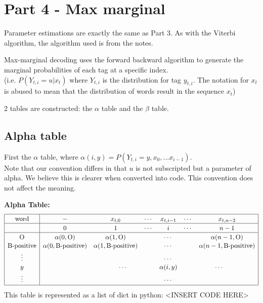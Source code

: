 \documentclass[12pt]{article}
\begin{document}
\section{Part 4 - Max marginal}

Parameter estimations are exactly the same as Part 3. As with the Viterbi algorithm, the algorithm used is from the notes.

\bigskip

Max-marginal decoding uses the forward backward algorithm to generate the marginal probabilities of each tag at a specific index.\\
(i.e. \(P(Y_{t,i}=u | x_t)\) where \(Y_{t,i}\) is the distribution for tag \(y_{t,i}\). The notation for \(x_t\) is abused to mean that the distribution of words result in the sequence \(x_t\))

2 tables are constructed: the \(\alpha\) table and the \(\beta\) table.

\subsection{Alpha table}
First the \(\alpha\) table, where \(\alpha(i, y) = P(Y_{t,i}=y, x_0, ... x_{i-1})\).\\
Note that our convention differs in that \(u\) is not subscripted but a parameter of alpha. We believe this is clearer when converted into code. This convention does not affect the meaning.

\textbf{Alpha Table:}
\[
\begin{array}{|c|cccccc|}
\hline \rule{0pt}{1em}
\mbox{word} & - & x_{t,0} & \cdots & x_{t,i-1} & \cdots & x_{t,n-2} \\
\hline \rule{0pt}{1em}
& 0 & 1 & \cdots & i & \cdots & n-1 \\
\hline \rule{0pt}{1em}
\mbox{O}          & \alpha(0,\mbox{O}) & \alpha(1,\mbox{O}) & \multicolumn{3}{c}{\cdots} & \alpha(n-1,\mbox{O}) \\[0.1em]
\mbox{B-positive} & \alpha(0,\mbox{B-positive}) & \alpha(1,\mbox{B-positive}) & \multicolumn{3}{c}{\cdots} & \alpha(n-1,\mbox{B-positive}) \\[0.1em]
\vdots & &         & \multicolumn{3}{c}{\cdots} &            \\[0.1em]
y      & &\multicolumn{2}{c}{\cdots} & \alpha(i,y) & \multicolumn{2}{c|}{\cdots} \\[0.1em]
\vdots & &         & \multicolumn{3}{c}{\cdots} &            \\[0.1em]
\hline
\end{array}
\]
This table is represented as a list of dict in python:
<INSERT CODE HERE>
\end{document}
